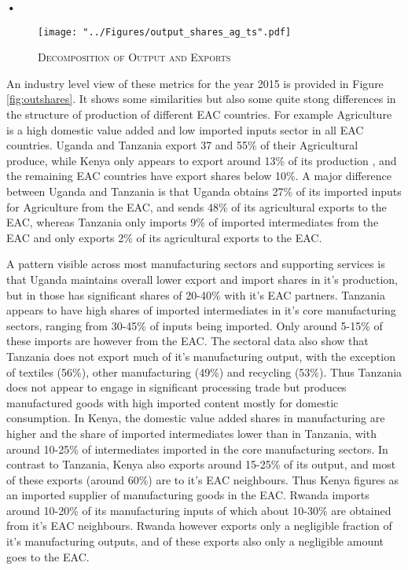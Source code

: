 \textbf{\textbf{•}}\documentclass[a4paper]{article}
\begin{document}
\begin{figure}[h!]
\centering
\caption{\label{fig:outshares_ag_ts}\textsc{Decomposition of Output and Exports}}
\texttt{[image: "../Figures/output\_shares\_ag\_ts".pdf]} %
\end{figure}
\FloatBarrier

An industry level view of these metrics for the year 2015 is provided in Figure \ref{fig:outshares}. It shows some similarities but also some quite stong differences in the structure of production of different EAC countries. For example Agriculture is a high domestic value added and low imported inputs sector in all EAC countries. Uganda and Tanzania export 37 and 55\% of their Agricultural produce, while Kenya only appears to export around 13\% of its production , and the remaining EAC countries have export shares below 10\%. A major difference between Uganda and Tanzania is that Uganda obtains 27\% of its imported inputs for Agriculture from the EAC, and sends 48\% of its agricultural exports to the EAC, whereas Tanzania only imports 9\% of imported intermediates from the EAC and only exports 2\% of its agricultural exports to the EAC. \newline

A pattern visible across most manufacturing sectors and supporting services is that Uganda maintains overall lower export and import shares in it's production, but in those has significant shares of 20-40\% with it's EAC partners. Tanzania appears to have high shares of imported intermediates in it's core manufacturing sectors, ranging from 30-45\% of inputs being imported. Only around 5-15\% of these imports are however from the EAC. The sectoral data also show that Tanzania does not export much of it's manufacturing output, with the exception of textiles (56\%), other manufacturing (49\%) and recycling (53\%). Thus Tanzania does not appear to engage in significant processing trade but produces manufactured goods with high imported content mostly for domestic consumption. In Kenya, the domestic value added shares in manufacturing are higher and the share of imported intermediates lower than in Tanzania, with around 10-25\% of intermediates imported in the core manufacturing sectors. In contrast to Tanzania, Kenya also exports around 15-25\% of its output, and most of these exports (around 60\%) are to it's EAC neighbours. Thus Kenya figures as an imported supplier of manufacturing goods in the EAC. Rwanda imports around 10-20\% of its manufacturing inputs of which about 10-30\% are obtained from it's EAC neighbours. Rwanda however exports only a negligible fraction of it's manufacturing outputs, and of these exports also only a negligible amount goes to the EAC. \newline
\end{document}

